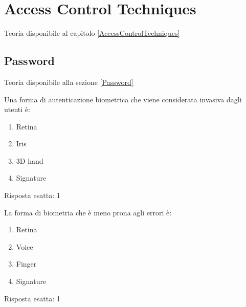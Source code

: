 \chapter{Access Control Techniques}

Teoria disponibile al capitolo \ref{AccessControlTechniques}

\section{Password}
\label{EsPass}

Teoria disponibile alla sezione \ref{Password}


\begin{Exercise} [
  title={Domanda},
  label={pass1}
 ]

 \Question Una forma di autenticazione biometrica che viene considerata
invasiva dagli utenti è:
\begin{enumerate}
 \item Retina
 \item Iris
 \item 3D hand
 \item Signature
\end{enumerate}

\end{Exercise}


\begin{Answer} [
  ref={pass1},
  number={1}
  ]

  \Question Risposta esatta: 1

\end{Answer}


\begin{Exercise} [
  title={Domanda},
  label={pass2}
 ]

 \Question La forma di biometria che è meno prona agli errori è:
\begin{enumerate}
\item Retina
\item Voice
\item Finger
\item Signature
\end{enumerate}


\end{Exercise}


\begin{Answer} [
  ref={pass2},
  number={2}
  ]

  \Question Risposta esatta: 1

\end{Answer}

